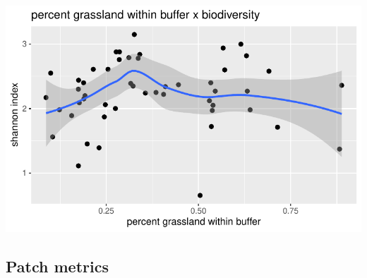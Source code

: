 \documentclass[
  letterpaper,
  DIV=11,
  numbers=noendperiod]{scrartcl}
\begin{document}
\includegraphics{Landscape_Indices_files/figure-pdf/unnamed-chunk-17-5.pdf}

\hypertarget{patch-metrics}{%
\subsection{Patch metrics}\label{patch-metrics}}
\end{document}
